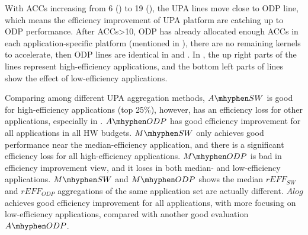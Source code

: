 


With ACCs increasing from 6 () to 19 (), the UPA lines move close to ODP line, which means the efficiency improvement of UPA platform are catching up to ODP performance. 
After ACCs>10, ODP has already allocated enough ACCs in each application-specific platform (mentioned in ), there are no remaining kernels to accelerate, then ODP lines are identical in  and . 
In , the up right parts of the lines represent high-efficiency applications, and the bottom left parts of lines show the effect of low-efficiency applications. 





Comparing among different UPA aggregation methods, 
$A\mhyphen SW$ is good for high-efficiency applications (top 25\%), however, has an efficiency loss for other applications, especially in .
$A\mhyphen ODP$ has good efficiency improvement for all applications in all HW budgets.
$M\mhyphen SW$ only achieves good performance near the median-efficiency application, and there is a significant efficiency loss for all high-efficiency applications. 
$M\mhyphen ODP$ is bad in efficiency improvement view, and it loses in both median- and low-efficiency applications. 
$M\mhyphen SW$ and $M\mhyphen ODP$ shows the median $rEFF_{SW}$ and $rEFF_{ODP}$ aggregations of the same application set are actually different. 
$Alog$ achieves good efficiency improvement for all applications, with more focusing on low-efficiency applications, compared with another good evaluation $A\mhyphen ODP$.
